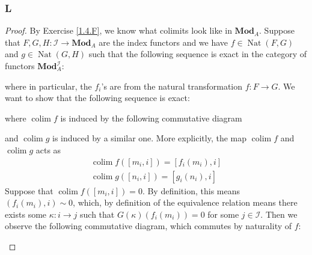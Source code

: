 \documentclass{article}
\newcommand{\fI}{\mathscr{I}}
\DeclareMathOperator{\colim}{colim}
\DeclareMathOperator{\Nat}{Nat}
\newcommand{\Mod}{\mathbf{Mod}} %
\begin{document}
\subsubsection{L}\label{1.6.L}
\begin{proof}
By Exercise \ref{1.4.F}, we know what colimits look like in $\Mod_A$. Suppose that $F,G,H: \fI\to \Mod_A$ are the index functors and we have $f\in \Nat(F,G)$ and $g\in \Nat( G,H)$ such that the following sequence is exact in the category of functors $\Mod_A^\fI$:
\begin{center}
\end{center}
where in particular, the $f_i$'s are from the natural transformation $f:F\to G$. We want to show that the following sequence is exact:
\begin{center}
\end{center}
where $\colim f$ is induced by the following commutative diagram
\begin{center}
\end{center}
and $\colim g$ is induced by a similar one. More explicitly, the map $\colim f$ and $\colim g$ acts as
\begin{align*}
    \colim f ([m_i,i])=[f_i(m_i),i]\\
    \colim g([n_i,i])=[g_i(n_i),i]
\end{align*}
Suppose that $\colim f([m_i,i])=0$. By definition, this means $(f_i(m_i),i)\sim 0$, which, by definition of the equivalence relation means there exists some $\kappa:i\to j$ such that $G(\kappa)(f_i(m_i))=0$ for some $j\in \fI$. Then we observe the following commutative diagram, which commutes by naturality of $f$:
\begin{center}

\end{center}
\end{proof}
\end{document}
